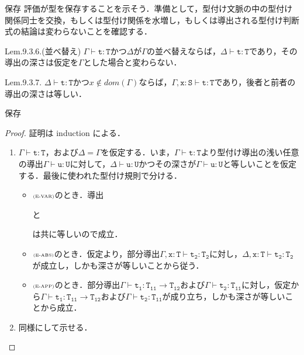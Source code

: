 \documentclass[9pt]{beamer}
\begin{document}
\begin{frame}{保存}
評価が型を保存することを示そう．準備として，型付け文脈の中の型付け関係同士を交換，もしくは型付け関係を水増し，もしくは導出される型付け判断式の結論は変わらないことを確認する．
\begin{alertblock}{Lem.9.3.6.(並べ替え)}
$\Gamma\vdash\mathtt{t:T}$かつ$\Delta$が$\Gamma$の並べ替えならば，$\Delta\vdash\mathtt{t:T}$であり，その導出の深さは仮定を$\Gamma$とした場合と変わらない．
\end{alertblock}
\begin{alertblock}{Lem.9.3.7.}
$\Delta\vdash \mathtt{t:T}$かつ$x\notin\mathrel{dom}(\Gamma)$ならば，$\Gamma,\mathtt{x:S\vdash t:T}$であり，後者と前者の導出の深さは等しい．
\end{alertblock}
\end{frame}
\begin{frame}{保存}
	\begin{proof}
		証明は induction による．\begin{enumerate}
		\item $\Gamma\vdash\mathtt{t:T}$，および$\Delta = \Gamma$を仮定する．いま，$\Gamma\vdash\mathtt{t:T}$より型付け導出の浅い任意の導出$\Gamma\vdash\mathtt{u:U}$に対して，$\Delta\vdash\mathtt{u:U}$かつその深さが$\Gamma\vdash\mathtt{u:U}$と等しいことを仮定する．最後に使われた型付け規則で分ける．\begin{itemize}
		\item$\text{\tiny\rm{(E-VAR)}}$のとき．導出\begin{prooftree}
		\end{prooftree}と\begin{prooftree}
		\end{prooftree}は共に等しいので成立．
		\item $\text{\tiny\rm{(E-ABS)}}$のとき．仮定より，部分導出$\Gamma,\mathtt{x:T}\vdash\mathtt{t_{2}:T_{2}}$に対し，$\Delta,\mathtt{x:T}\vdash\mathtt{t_{2}:T_{2}}$が成立し，しかも深さが等しいことから従う．
		\item $\text{\tiny\rm{(E-APP)}}$のとき．部分導出$\Gamma\vdash\mathtt{t_{1}:T_{11}\rightarrow T_{12}}$および$\Gamma\vdash\mathtt{t_{2}:T_{11}}$に対し，仮定から$\Gamma\vdash\mathtt{t_{1}:T_{11}\rightarrow T_{12}}$および$\Gamma\vdash\mathtt{t_{2}:T_{11}}$が成り立ち，しかも深さが等しいことから成立．
		\end{itemize}
		\item 同様にして示せる．
		\end{enumerate}
		
		\end{proof}

\end{frame}
\end{document}
